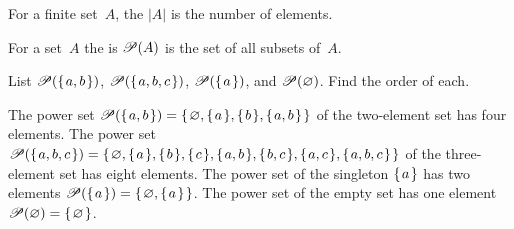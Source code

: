 \documentclass{ibl}  %
\begin{document}
\begin{df}
For a finite set~$A$, the  $|A|$ is the number of elements.
\end{df}


\begin{df}
For a set~$A$ the  is $\powerset(A)$ is the set of all
subsets of~$A$.
\end{df}

\begin{ex} List 
  $\powerset(\set{a,b})$,   
  $\powerset(\set{a,b,c})$,   
  $\powerset(\set{a})$, and   
  $\powerset(\emptyset)$.
  Find the order of each.   
\begin{ans}
The power set
$\powerset(\set{a,b})=\set{\emptyset, \set{a}, \set{b}, \set{a,b}}$
of the two-element set has four elements.
The power set 
$\powerset(\set{a,b,c})=\set{\emptyset,\set{a},\set{b},\set{c},
                             \set{a,b},\set{b,c},\set{a,c},\set{a,b,c}}$
of the three-element set has eight elements.
The power set of the singleton $\set{a}$ has two elements
$\powerset(\set{a})=\set{\emptyset,\set{a}}$.
The power set of the empty set has one element
$\powerset(\emptyset)=\set{\emptyset}$.   
\end{ans}
\end{ex}
\end{document}
